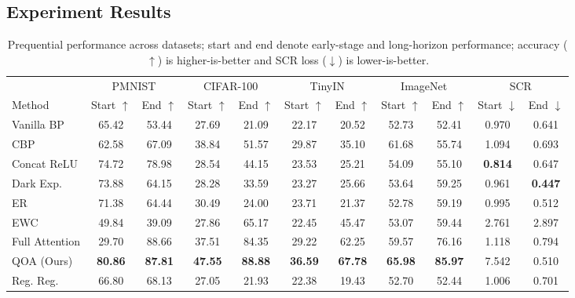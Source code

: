 \documentclass{article}
\begin{document}
\subsection{Experiment Results}
\begin{table}[ht]

\caption{Prequential performance across datasets; start and end denote early-stage and long-horizon performance; accuracy ($\uparrow$) is higher-is-better and SCR loss ($\downarrow$) is lower-is-better.}
\label{tab:main_results}

\centering
\footnotesize
\setlength{\tabcolsep}{2.5pt}

\begin{tabular}{lcccccccccc}
\toprule
& \multicolumn{2}{c}{PMNIST} & \multicolumn{2}{c}{CIFAR-100} & \multicolumn{2}{c}{TinyIN} & \multicolumn{2}{c}{ImageNet} & \multicolumn{2}{c}{SCR} \\
Method 
& Start $\uparrow$ & End $\uparrow$ 
& Start $\uparrow$ & End $\uparrow$ 
& Start $\uparrow$ & End $\uparrow$ 
& Start $\uparrow$ & End $\uparrow$ 
& Start $\downarrow$ & End $\downarrow$ \\
\midrule
Vanilla BP      & 65.42 & 53.44 & 27.69 & 21.09 & 22.17 & 20.52 & 52.73 & 52.41 & 0.970 & 0.641 \\
CBP             & 62.58 & 67.09 & 38.84 & 51.57 & 29.87 & 35.10 & 61.68 & 55.74 & 1.094 & 0.693 \\
Concat ReLU     & 74.72 & 78.98 & 28.54 & 44.15 & 23.53 & 25.21 & 54.09 & 55.10 & \textbf{0.814} & 0.647 \\
Dark Exp.       & 73.88 & 64.15 & 28.28 & 33.59 & 23.27 & 25.66 & 53.64 & 59.25 & 0.961 & \textbf{0.447} \\
ER              & 71.38 & 64.44 & 30.49 & 24.00 & 23.71 & 21.37 & 52.78 & 59.19 & 0.995 & 0.512 \\
EWC             & 49.84 & 39.09 & 27.86 & 65.17 & 22.45 & 45.47 & 53.07 & 59.44 & 2.761 & 2.897 \\
Full Attention  & 29.70 & 88.66 & 37.51 & 84.35 & 29.22 & 62.25 & 59.57 & 76.16 & 1.118 & 0.794 \\
QOA (Ours)      & \textbf{80.86} & \textbf{87.81} 
                & \textbf{47.55} & \textbf{88.88} 
                & \textbf{36.59} & \textbf{67.78} 
                & \textbf{65.98} & \textbf{85.97} 
                & 7.542 & 0.510 \\
Reg. Reg.       & 66.80 & 68.13 & 27.05 & 21.93 & 22.38 & 19.43 & 52.70 & 52.44 & 1.006 & 0.701 \\
\bottomrule
\end{tabular}

\end{table}
\end{document}
